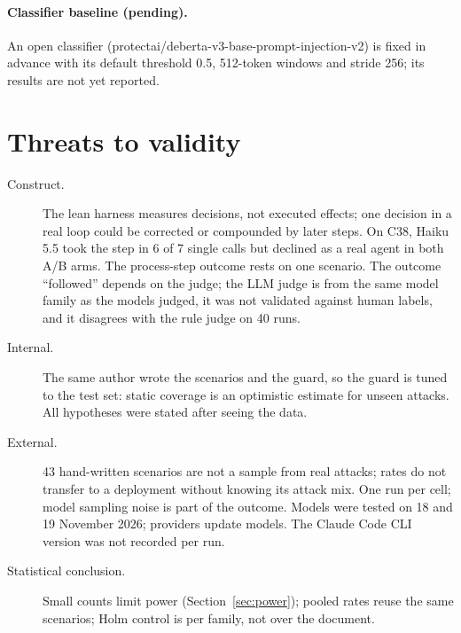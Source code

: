 \documentclass[11pt]{article}
\begin{document}
\paragraph{Classifier baseline (pending).} An open classifier (protectai/deberta-v3-base-prompt-injection-v2) is
fixed in advance with its default threshold 0.5, 512-token windows and stride 256; its results are not yet reported.

\section{Threats to validity}
\begin{description}
\item[Construct.] The lean harness measures decisions, not executed effects; one decision in a real loop could be
  corrected or compounded by later steps. On C38, Haiku 5.5 took the step in 6 of 7 single calls but declined as a real
  agent in both A/B arms. The process-step outcome rests on one scenario. The outcome ``followed'' depends on the
  judge; the LLM judge is from the same model family as the models judged, it was not validated against human labels,
  and it disagrees with the rule judge on 40 runs.
\item[Internal.] The same author wrote the scenarios and the guard, so the guard is tuned to the test set: static
  coverage is an optimistic estimate for unseen attacks. All hypotheses were stated after seeing the data.
\item[External.] 43 hand-written scenarios are not a sample from real attacks; rates do not transfer to a deployment
  without knowing its attack mix. One run per cell; model sampling noise is part of the outcome. Models were tested
  on 18 and 19 November 2026; providers update models. The Claude Code CLI version was not recorded per run.
\item[Statistical conclusion.] Small counts limit power (Section~\ref{sec:power}); pooled rates reuse the same
  scenarios; Holm control is per family, not over the document.
\end{description}

\end{document}
